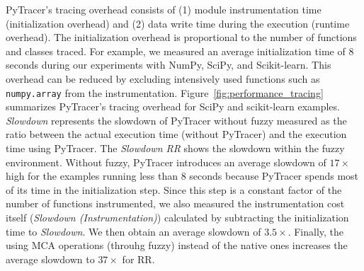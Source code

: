 \documentclass[10pt,journal,compsoc]{IEEEtran}
\newcommand{\pytracer}[0]{PyTracer\xspace}
\DeclareRobustCommand{\add}[1]{#1}
\DeclareRobustCommand{\remove}[1]{}
\begin{document}
\pytracer's tracing overhead consists of (1) module instrumentation time
(initialization overhead) and (2) data write time during the execution (runtime
overhead). The initialization overhead is proportional to the number of
functions and classes traced. For example, we measured an average initialization
time of 8 seconds during our experiments with  NumPy, SciPy, and Scikit-learn.
This overhead can be reduced by excluding intensively used functions such as
\texttt{numpy.array} from the instrumentation.
Figure~\ref{fig:performance_tracing} summarizes \pytracer's tracing overhead for
SciPy and scikit-learn examples. \textit{Slowdown} represents the slowdown of
\pytracer without fuzzy measured as the ratio between the actual execution time
(without \pytracer) and the execution time using \pytracer. The \textit{Slowdown
    RR} \remove{and \textit{Slowdown MCA}} shows the slowdown within the fuzzy environment.
Without fuzzy, \pytracer introduces an average slowdown of $17\times$ high for
the examples running less than 8 seconds because \pytracer spends most of its
time in the initialization step. Since this step is a constant factor of the
number of functions instrumented, we also measured the instrumentation cost
itself (\textit{Slowdown (Instrumentation)}) calculated by subtracting the
initialization time to \textit{Slowdown}. We then obtain an average slowdown of
$3.5\times$. Finally, the \remove{fuzzy instrumentation} \add{using MCA
    operations (throuhg fuzzy) instead of the native ones} increases the average
slowdown to $37\times$ for RR\remove{and $43\times$ for Full MCA}.

\end{document}
